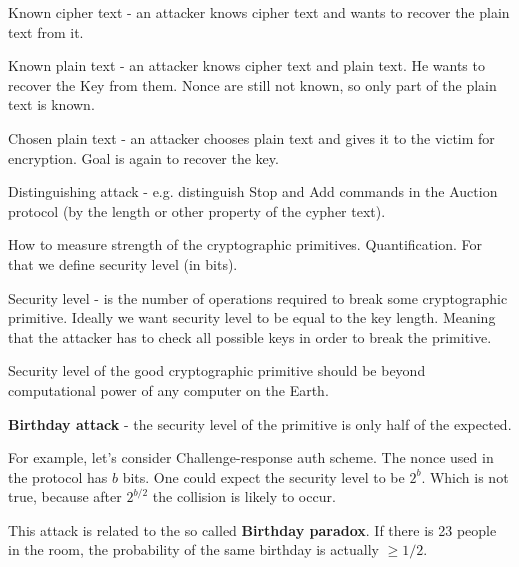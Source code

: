 \begin{example}
	Known cipher text - an attacker knows cipher text and wants to recover the plain text from it.
\end{example}

\begin{example}
	Known plain text - an attacker knows cipher text and plain text. He wants to recover the Key from them. Nonce are still not known, so only part of the plain text is known.
\end{example}

\begin{example}
	Chosen plain text - an attacker chooses plain text and gives it to the victim for encryption. Goal is again to recover the key.
\end{example}

\begin{example}
	Distinguishing attack - e.g. distinguish Stop and Add commands in the Auction protocol (by the length or other property of the cypher text).
\end{example}

How to measure strength of the cryptographic primitives. Quantification. For that we define security level (in bits).

\begin{definition}
	Security level - is the number of operations required to break some cryptographic primitive.
	Ideally we want security level to be equal to the key length. Meaning that the attacker has to check all possible keys in order to break the primitive.

	Security level of the good cryptographic primitive should be beyond computational power of any computer on the Earth.
\end{definition}

\begin{example}
	\textbf{Birthday attack} - the security level of the primitive is only half of the expected.

	For example, let's consider Challenge-response auth scheme.
	The nonce used in the protocol has $b$ bits. One could expect the security level to be $2^b$.
	Which is not true, because after $2^{b/2}$ the collision is likely to occur.

	This attack is related to the so called \textbf{Birthday paradox}.
	If there is 23 people in the room, the probability of the same birthday is actually $ \geq 1/2$.
\end{example}

